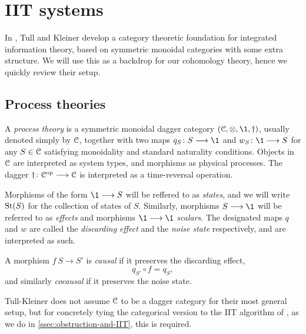 

\section{IIT systems}

In \citeme, Tull and Kleiner develop a category theoretic foundation for integrated information theory, based on symmetric monoidal categories with some extra structure. We will use this as a backdrop for our cohomology theory, hence we quickly review their setup. 

\subsection{Process theories}

\begin{definition}
    A \emph{process theory} is a symmetric monoidal dagger category $(\C, \otimes, \1, \dagger)$, usually denoted simply by $\EuScript{C}$, together with two maps $q_S\: S\to \1$ and $w_S\: \1\to S$ for any $S\in \EuScript{C}$ satisfying monoidality and standard naturality conditions. Objects in $\EuScript{C}$ are interpreted as system types, and morphisms as physical processes. The dagger $\dagger\colon \EuScript{C}^{\mathrm{op}}\longrightarrow \EuScript{C}$ is interpreted as a time-reversal operation. 
\end{definition}

Morphisms of the form $\1 \to S$ will be reffered to as \emph{states}, and we will write $\operatorname{St}(S)$ for the collection of states of $S$. Similarly, morphisms $S\to \1$ will be referred to as \emph{effects} and morphisms $\1\to \1$ \emph{scalars}. The designated maps $q$ and $w$ are called the \emph{discarding effect} and the \emph{noise state} respectively, and are interpreted as such. 

\begin{definition}
    A morphism $f\:S\to S'$ is \emph{causal} if it preserves the discarding effect, 
$$q_{S'}\circ f = q_S,$$
and similarly \emph{cocausal} if it preserves the noise state. 
\end{definition}

\begin{remark}
    Tull-Kleiner does not assume $\EuScript{C}$ to be a dagger category for their most general setup, but for concretely tying the categorical version to the IIT algorithm of \citeme, as we do in \cref{ssec:obstruction-and-IIT}, this is required. 
\end{remark}



